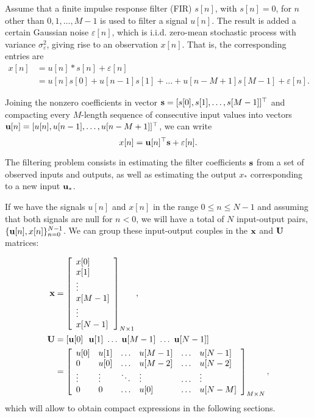 Assume that a finite impulse response filter (FIR) $s[n]$, with $s[n]=0$, for $n$ other than $0,1, \ldots, M-1$ is used to filter a signal $u[n]$. The result is added a certain Gaussian noise $\varepsilon[n]$, which is i.i.d. zero-mean stochastic process with variance $\sigma_\varepsilon^2 $, giving rise to an observation $x[n]$. That is, the corresponding entries are
\begin{align}
x[n] &= u[n]*s[n] + \varepsilon[n]\\
     & = u[n]s[0] + u[n-1]s[1] + \ldots + u[n-M+1]s[M-1] + \varepsilon[n].
\end{align}

Joining the nonzero coefficients in vector ${\mathbf s} = [s[0], s[1], \ldots, s[M-1]]^\top$ and compacting every $M$-length sequence of consecutive input values into vectors ${\mathbf u}[n] = [u[n], u[n-1], \ldots, u[n-M+1]]^\top$, we can write
\begin{equation}
x[n] = {\mathbf u}[n]^\top {\mathbf s}+  \varepsilon[n].
\end{equation}

The filtering problem consists in estimating the filter coefficients ${\mathbf s}$ from a set of observed inputs and outputs, as well as estimating the output $x_*$ corresponding to a new input ${\mathbf u}_*$.

If we have the signals $u[n]$ and $x[n]$ in the range $0\leq n \leq N-1$ and assuming that both signals are null for $n <0$, we will have a total of $N$ input-output pairs, $\{{\mathbf u}[n], x[n]\}_{n=0}^{N-1}$. We can group these input-output couples in the ${\mathbf x}$ and ${\mathbf U}$ matrices:

\begin{align}
{\mathbf x} &= \left[\begin{array}{l}
                 x[0] \\ x[1] \\ \vdots \\ x[M-1] \\ \vdots \\ x[N-1] \\
            \end{array} \right]_{N\times 1},  \\
\nonumber
{\mathbf U} &= [{\mathbf u}[0]~~{\mathbf u}[1]~\ldots~{\mathbf u}[M-1]~\ldots~{\mathbf u}[N-1] ]\\
    &= \left[\begin{array}{llllll}
                u[0]  & u[1]   & \ldots & u[M-1] & \ldots & u[N-1] \\
                0     & u[0]   & \ldots & u[M-2] & \ldots & u[N-2] \\
               \vdots & \vdots & \ddots & \vdots & \ldots & \vdots \\
               0      & 0      & \ldots & u[0]   & \ldots & u[N-M] \\
              \end{array} \right]_{M\times N},
\end{align}
which will allow to obtain compact expressions in the following sections.

